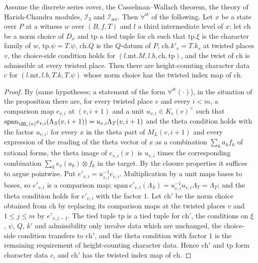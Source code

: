 \begin{proposition}\label{pf:baselat2:choice}
Assume the discrete series cover, the Casselman--Wallach theorem, the theory of Harish-Chandra modules,
$\mathcal I_3$ and $\mathcal I_{\mathrm{ser}}$. Then $\forall^{\mathrm{st}}$ of the following. Let $x$ be a state over $P$ at a
witness $w$ over $(B,f,T)$ and $l$ a third intermediate level of $x$; let $\mathrm{ch}$ be a norm choice of $D_x$ and
$\mathrm{tp}$ a tied tuple for $\mathrm{ch}$ such that $\mathrm{tp}.\xi$ is the character family of $w$, $\mathrm{tp}.\psi=T.\psi$,
$\mathrm{ch}.Q$ is the $Q$-datum of $P$, $\mathrm{ch}.k'_v=T.k_v$ at twisted places $v$, the choice-side condition holds for
$(l.\mathrm{mt}.M,l.b,\mathrm{ch},\mathrm{tp})$, and the twist of $\mathrm{ch}$ is admissible at every twisted place. Then there are
height-counting character data $c$ for $(l.\mathrm{mt},l.b,T.k,T.\psi)$ whose norm choice has the twisted index map
of $\mathrm{ch}$.
\end{proposition}

\begin{proof}
By  (same hypotheses; a statement of the
form $\forall^{\mathrm{st}}(\cdot)$), in the situation of the proposition there are, for every twisted place $v$ and every
$i<m$, a comparison map $e_{v,i}$ at $(v,i+1)$ and a unit $u_{v,i}\in K_e(v)^\times$ such that
$\mathrm{span}_{\OO_e(v)}e_{v,i}(\Lambda_S(v,i+1))=u_{v,i}\Lambda_T(v,i+1)$ and the theta condition holds with the factor
$u_{v,i}$: for every $x$ in the theta part of $M_L(v,i+1)$ and every expression of the reading of the theta vector of
$x$ as a combination $\sum_ka_kf_k$ of rational forms, the theta image of $e_{v,i}(x)$ is $u_{v,i}$ times the
corresponding combination $\sum_ke_v(a_k)\otimes f_k$ in the target. By the closure properties it suffices to argue
pointwise. Put $e'_{v,i}=u_{v,i}^{-1}e_{v,i}$. Multiplication by a unit maps bases to bases, so $e'_{v,i}$ is a
comparison map; $\mathrm{span}\,e'_{v,i}(\Lambda_S)=u_{v,i}^{-1}u_{v,i}\Lambda_T=\Lambda_T$; and the theta condition holds for
$e'_{v,i}$ with the factor $1$. Let $\mathrm{ch}'$ be the norm choice obtained from $\mathrm{ch}$ by replacing its comparison
maps at the twisted places $v$ and $1\le j\le m$ by $e'_{v,j-1}$. The tied tuple $\mathrm{tp}$ is a tied tuple for
$\mathrm{ch}'$, the conditions on $\xi$, $\psi$, $Q$, $k'$ and admissibility only involve data which are unchanged, the
choice-side condition transfers to $\mathrm{ch}'$, and the theta condition with factor $1$ is the remaining
requirement of height-counting character data. Hence $\mathrm{ch}'$ and $\mathrm{tp}$ form character data $c$, and
$\mathrm{ch}'$ has the twisted index map of $\mathrm{ch}$.
\end{proof}

